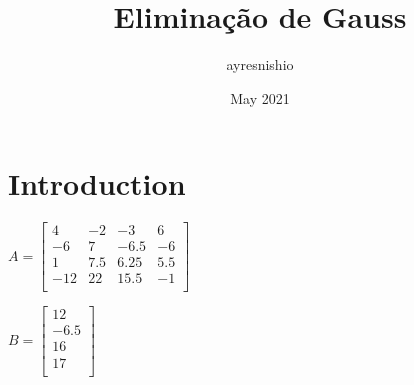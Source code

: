 \documentclass{article}
\title{Eliminação de Gauss}
\author{ayresnishio }
\date{May 2021}
\begin{document}
\maketitle

\section{Introduction}
$
A=
    \begin{bmatrix}
         4 & -2 & -3   &  6\\
        -6 &  7 & -6.5 & -6\\
        1 & 7.5 & 6.25 & 5.5\\
        -12 & 22 & 15.5 & -1\\
    \end{bmatrix}
$

$
B=
    \begin{bmatrix}
         12 \\
        -6.5\\
         16\\
         17\\
    \end{bmatrix}
$
\end{document}
